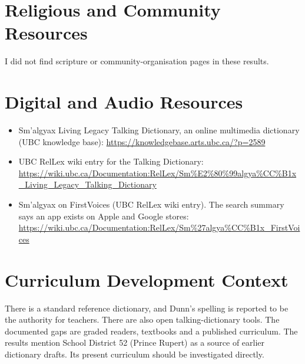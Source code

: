 \documentclass[12pt]{article}
\begin{document}
\section{Religious and Community Resources}
I did not find scripture or community-organisation pages in these results.

\section{Digital and Audio Resources}
\begin{itemize}
\item Sm'algyax Living Legacy Talking Dictionary, an online multimedia dictionary (UBC knowledge base): \url{https://knowledgebase.arts.ubc.ca/?p=2589}
\item UBC RelLex wiki entry for the Talking Dictionary: \url{https://wiki.ubc.ca/Documentation:RelLex/Sm%E2%80%99algya%CC%B1x_Living_Legacy_Talking_Dictionary}
\item Sm'algyax on FirstVoices (UBC RelLex wiki entry). The search summary says an app exists on Apple and Google stores: \url{https://wiki.ubc.ca/Documentation:RelLex/Sm%27algya%CC%B1x_FirstVoices}
\end{itemize}

\section{Curriculum Development Context}
There is a standard reference dictionary, and Dunn's spelling is reported to be the authority for teachers. There are also open talking-dictionary tools. The documented gaps are graded readers, textbooks and a published curriculum. The results mention School District 52 (Prince Rupert) as a source of earlier dictionary drafts. Its present curriculum should be investigated directly.
\end{document}
